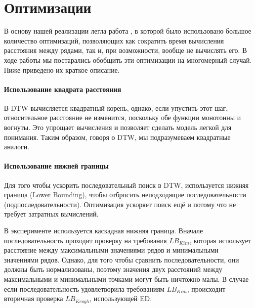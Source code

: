 \documentclass[12pt,twoside]{article}
\begin{document}


						
    \section{Оптимизации}
        В основу нашей реализации легла работа \cite{Rakthanmanon:2012:SMT:2339530.2339576}, в которой было
        использовано большое количество оптимизаций, позволяющих как сократить время вычисления расстояния 
        между рядами, так и, при возможности, вообще не вычислять его. 
        В ходе работы мы постарались обобщить эти оптимизации на многомерный случай.
        Ниже приведено их краткое описание. 

        \paragraph{Использование квадрата расстояния}	
        В DTW вычисляется квадратный корень, однако, если упустить этот шаг,
        относительное расстояние не изменится, поскольку обе функции монотонны и вогнуты.
        Это упрощает вычисления и позволяет сделать модель легкой для понимания.
        Таким образом, говоря о DTW, мы подразумеваем квадратные аналоги.
        
        \paragraph{Использование нижней границы}
        Для того чтобы ускорить последовательный поиск в DTW, используется нижняя граница (Lower Bounding),
        чтобы отбросить неподходящие последовательности (подпоследовательности).
        Оптимизация ускоряет поиск ещё и потому что не требует затратных вычислений.
        
        В эксперименте используется каскадная нижняя граница.
        Вначале последовательность проходит проверку на требования $LB_{Kim}$,
        которая использует расстояние между максимальными значениями рядов и минимальными значениями рядов.
        Однако, для того чтобы сравнить последовательности, они должны быть нормализованы,
        поэтому значения двух расстояний между максимальными и минимальными точками могут быть ничтожно малы.
        В случае если последовательность удовлетворила требованиям $LB_{Kim}$, происходит вторичная проверка $LB_{Keogh}$, использующей ED.
        
\end{document}
